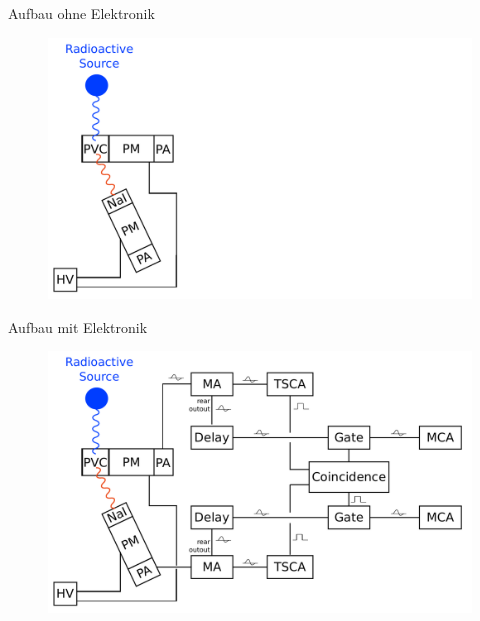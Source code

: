 \documentclass[xcolor=x11names,compress]{beamer}
\renewcommand{\(}{\begin{columns}}
\renewcommand{\)}{\end{columns}}
\newcommand{\<}[1]{\begin{column}{#1}}
\renewcommand{\>}{\end{column}}
\begin{document}
\begin{frame}[t]{Aufbau ohne Elektronik}
\begin{figure}[htpb]
    \centering
    \includegraphics[width=1.0\linewidth]{../figures/setup_pres_pre}
\label{fig:setup_pre}
\end{figure}
\end{frame}

\begin{frame}[t]{Aufbau mit Elektronik}
 \begin{figure}[htpb]
    \centering
    \includegraphics[width=1.0\linewidth]{../figures/setup_pres}
\label{fig:setup_pre}
\end{figure}
\end{frame}
\end{document}
